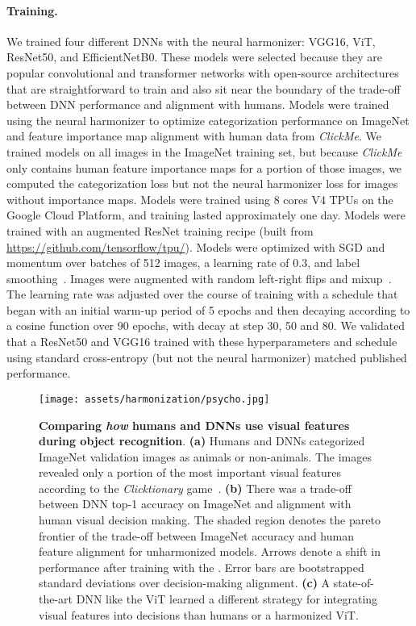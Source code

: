 \paragraph{Training.} We trained four different DNNs with the neural harmonizer: VGG16, ViT, ResNet50, and EfficientNetB0. These models were selected because they are popular convolutional and transformer networks with open-source architectures that are straightforward to train and also sit near the boundary of the trade-off between DNN performance and alignment with humans. Models were trained using the neural harmonizer to optimize categorization performance on ImageNet and feature importance map alignment with human data from \textit{ClickMe}. We trained models on all images in the ImageNet training set, but because \textit{ClickMe} only contains human feature importance maps for a portion of those images, we computed the categorization loss but not the neural harmonizer loss for images without importance maps. Models were trained using 8 cores V4 TPUs on the Google Cloud Platform, and training lasted approximately one day. Models were trained with an augmented ResNet training recipe (built from \url{https://github.com/tensorflow/tpu/}). Models were optimized with SGD and momentum over batches of 512 images, a learning rate of $0.3$, and label smoothing~\cite{Muller2019-td}. Images were augmented with random left-right flips and mixup~\cite{Zhang2017-hw}. The learning rate was adjusted over the course of training with a schedule that began with an initial warm-up period of 5 epochs and then  decaying according to a cosine function over 90 epochs, with decay at step 30, 50 and 80. We validated that a ResNet50 and VGG16 trained with these hyperparameters and schedule using standard cross-entropy (but not the neural harmonizer) matched published performance.


\begin{figure}[t!]
\begin{center}
   \texttt{[image: assets/harmonization/psycho.jpg]}
\end{center}
   \caption{\textbf{Comparing \textit{how} humans and DNNs use visual features during object recognition}. \textbf{(a)} Humans and DNNs categorized ImageNet validation images as animals or non-animals. The images revealed only a portion of the most important visual features according to the \textit{Clicktionary} game~\cite{Linsley2017-zt}. \textbf{(b)} There was a trade-off between DNN top-1 accuracy on ImageNet and alignment with human visual decision making. The shaded region denotes the pareto frontier of the trade-off between ImageNet accuracy and human feature alignment for unharmonized models. Arrows denote a shift in performance after training with the {\color{meta}{neural harmonizer}}. Error bars are bootstrapped standard deviations over decision-making alignment. \textbf{(c)} A state-of-the-art DNN like the ViT learned a different strategy for integrating visual features into decisions than humans or a harmonized ViT.}
 \label{fig:harmonization:psychophysics}
\end{figure}

